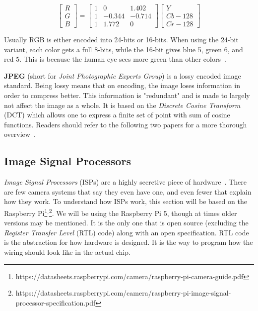 \[
\begin{bmatrix}
R \\
G \\
B
\end{bmatrix}
=
\begin{bmatrix}
1 & 0 & 1.402 \\
1 & -0.344 & -0.714 \\
1 & 1.772 & 0
\end{bmatrix}
\begin{bmatrix}
Y \\
Cb - 128 \\
Cr - 128
\end{bmatrix}
\]

Usually RGB is either encoded into 24-bits or 16-bits. When using the 24-bit
variant, each color gets a full 8-bits, while the 16-bit gives blue 5, green 6,
and red 5. This is because the human eye sees more green than other colors~\cite{davson2010human}.

\textbf{JPEG} (short for \textit{Joint Photographic Experts Group}) is a lossy
encoded image standard. Being lossy means that on encoding, the image loses
information in order to compress better. This information is "redundant" and is
made to largely not affect the image as a whole. It is based on the
\textit{Discrete Cosine Transform} (DCT) which allows one to express a finite
set of point with sum of cosine functions. Readers should refer to the
following two papers for a more thorough overview~\cite{wallace1991jpeg,
itu1993digital}.

\subsection{Image Signal Processors} \label{section:isp}
\textit{Image Signal Processors} (ISPs) are a highly secretive piece of
hardware~\cite{adams2010frankencamera}. There are few camera systems that say
they even have one, and even fewer that explain how they work. To understand
how ISPs work, this section will be based on the Raspberry Pi\footnote{\label{note:tuningguide}https://datasheets.raspberrypi.com/camera/raspberry-pi-camera-guide.pdf}$^,$\footnote{https://datasheets.raspberrypi.com/camera/raspberry-pi-image-signal-processor-specification.pdf}.
We will be using the Raspberry Pi 5, though at times older versions may be
mentioned. It is the only one that is open source (excluding the \textit{Register Transfer
Level} (RTL) code) along with an open specification. RTL code is the
abstraction for how hardware is designed. It is the way to program how the
wiring should look like in the actual chip.

